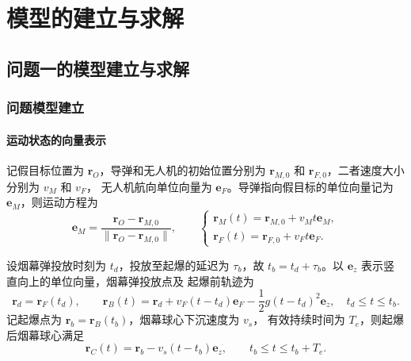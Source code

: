 \providecommand{\PoneReleasePoint}{(17620,\,0,\,1800)}
\providecommand{\PoneBurstTime}{5.1}
\providecommand{\PoneBurstPoint}{(17188,\,0,\,1736.496)}
\providecommand{\PoneCoverageStart}{8.056}
\providecommand{\PoneCoverageEnd}{9.448}
\providecommand{\PoneCoverageDuration}{1.392}

\section{模型的建立与求解}

\subsection{问题一的模型建立与求解}

\subsubsection{问题模型建立}

\paragraph{运动状态的向量表示}

记假目标位置为 $\boldsymbol r_O$，导弹和无人机的初始位置分别为
$\boldsymbol r_{M,0}$ 和 $\boldsymbol r_{F,0}$，二者速度大小分别为 $v_M$ 和 $v_F$，
无人机航向单位向量为 $\boldsymbol e_F$。导弹指向假目标的单位向量记为
$\boldsymbol e_M$，则运动方程为
\begin{equation}
  \boldsymbol e_M=
  \frac{\boldsymbol r_O-\boldsymbol r_{M,0}}
       {\lVert\boldsymbol r_O-\boldsymbol r_{M,0}\rVert},
  \qquad
  \begin{cases}
    \boldsymbol r_M(t)=\boldsymbol r_{M,0}+v_Mt\boldsymbol e_M,\\
    \boldsymbol r_F(t)=\boldsymbol r_{F,0}+v_Ft\boldsymbol e_F.
  \end{cases}
  \label{eq:p1-motion}
\end{equation}

设烟幕弹投放时刻为 $t_d$，投放至起爆的延迟为 $\tau_b$，故
$t_b=t_d+\tau_b$。以 $\boldsymbol e_z$ 表示竖直向上的单位向量，烟幕弹投放点及
起爆前轨迹为
\begin{equation}
  \boldsymbol r_d=\boldsymbol r_F(t_d),
  \qquad
  \boldsymbol r_B(t)=\boldsymbol r_d
  +v_F(t-t_d)\boldsymbol e_F
  -\frac{1}{2}g(t-t_d)^2\boldsymbol e_z,
  \quad t_d\le t\le t_b.
  \label{eq:p1-bomb}
\end{equation}
记起爆点为 $\boldsymbol r_b=\boldsymbol r_B(t_b)$，烟幕球心下沉速度为 $v_s$，
有效持续时间为 $T_e$，则起爆后烟幕球心满足
\begin{equation}
  \boldsymbol r_C(t)=\boldsymbol r_b-v_s(t-t_b)\boldsymbol e_z,
  \qquad t_b\le t\le t_b+T_e.
  \label{eq:p1-smoke}
\end{equation}

